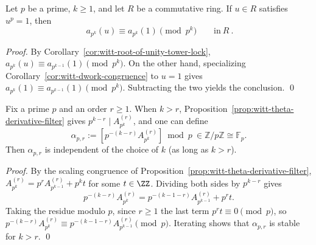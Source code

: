 \begin{corollary}\label{cor:witt-cyclotomic-invisibility}
Let \(p\) be a prime, \(k\ge 1\), and let \(R\) be a commutative ring. If \(u\in R\) satisfies \(u^p=1\), then
\[
\boxed{\ a_{p^k}(u)\equiv a_{p^k}(1)\pmod{p^k}\qquad\text{in}\ R\ }.
\]
\end{corollary}
\begin{proof}
By Corollary~\ref{cor:witt-root-of-unity-tower-lock}, \(a_{p^k}(u)\equiv a_{p^{k-1}}(1)\pmod{p^k}\).
On the other hand, specializing Corollary~\ref{cor:witt-dwork-congruence} to \(u=1\) gives \(a_{p^k}(1)\equiv a_{p^{k-1}}(1)\pmod{p^k}\).
Subtracting the two yields the conclusion. \qed
\end{proof}

\begin{corollary}\label{cor:witt-theta-stable-residue}
Fix a prime \(p\) and an order \(r\ge 1\). When \(k>r\), Proposition~\ref{prop:witt-theta-derivative-filter} gives \(p^{k-r}\mid A_{p^k}^{(r)}\), and one can define
\[
\alpha_{p,r}:=\left[p^{-(k-r)}A_{p^k}^{(r)}\right]\bmod p\ \in \mathbb{Z}/p\mathbb{Z}\cong\mathbb{F}_p.
\]
Then \(\alpha_{p,r}\) is independent of the choice of \(k\) (as long as \(k>r\)).
\end{corollary}
\begin{proof}
By the scaling congruence of Proposition~\ref{prop:witt-theta-derivative-filter},
\(
A_{p^k}^{(r)}=p^rA_{p^{k-1}}^{(r)}+p^k t
\)
for some \(t\in\ZZ\). Dividing both sides by \(p^{k-r}\) gives
\[
p^{-(k-r)}A_{p^k}^{(r)}=p^{-(k-1-r)}A_{p^{k-1}}^{(r)}+p^{r}t.
\]
Taking the residue modulo \(p\), since \(r\ge 1\) the last term \(p^r t\equiv 0\pmod p\), so
\(
p^{-(k-r)}A_{p^k}^{(r)}\equiv p^{-(k-1-r)}A_{p^{k-1}}^{(r)}\pmod p
\).
Iterating shows that \(\alpha_{p,r}\) is stable for \(k>r\). \qed
\end{proof}

